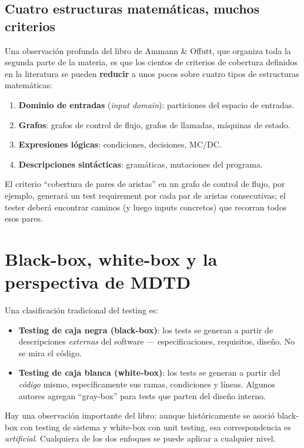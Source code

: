 \documentclass[12pt,a4paper]{article}
\begin{document}
\subsection{Cuatro estructuras matemáticas, muchos criterios}
Una observación profunda del libro de Ammann \& Offutt, que organiza toda la segunda parte de la materia, es que los cientos de criterios de cobertura definidos en la literatura se pueden \textbf{reducir} a unos pocos sobre cuatro tipos de estructuras matemáticas:
\begin{enumerate}
  \item \textbf{Dominio de entradas} (\textit{input domain}): particiones del espacio de entradas.
  \item \textbf{Grafos}: grafos de control de flujo, grafos de llamadas, máquinas de estado.
  \item \textbf{Expresiones lógicas}: condiciones, decisiones, MC/DC.
  \item \textbf{Descripciones sintácticas}: gramáticas, mutaciones del programa.
\end{enumerate}

El criterio ``cobertura de pares de aristas'' en un grafo de control de flujo, por ejemplo, generará un test requirement por cada par de aristas consecutivas; el tester deberá encontrar caminos (y luego inputs concretos) que recorran todos esos pares.

\section{Black-box, white-box y la perspectiva de MDTD}
Una clasificación tradicional del testing es:

\begin{itemize}
  \item \textbf{Testing de caja negra (black-box)}: los tests se generan a partir de descripciones \textit{externas} del software --- especificaciones, requisitos, diseño. No se mira el código.
  \item \textbf{Testing de caja blanca (white-box)}: los tests se generan a partir del \textit{código} mismo, específicamente sus ramas, condiciones y líneas. Algunos autores agregan ``gray-box'' para tests que parten del diseño interno.
\end{itemize}

Hay una observación importante del libro: aunque históricamente se asoció black-box con testing de sistema y white-box con unit testing, esa correspondencia es \textit{artificial}. Cualquiera de los dos enfoques se puede aplicar a cualquier nivel.
\end{document}
